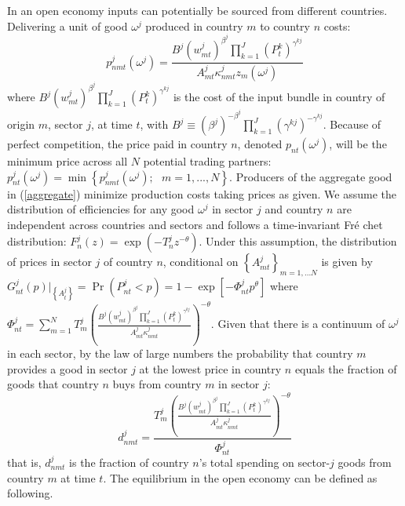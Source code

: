 \documentclass[12pt]{article}
\begin{document}
In an open economy inputs can potentially be sourced from different
countries. Delivering a unit of good $\omega ^{j}$ produced in country $m$
to country $n$ costs: 
\begin{equation*}
p_{nmt}^{j}(\omega ^{j})=\frac{B^{j}\left( w_{mt}^{j}\right) ^{\beta
^{j}}\prod_{k=1}^{J}(P_{t}^{k})^{\gamma ^{kj}}}{A_{mt}^{j}\kappa
_{nmt}^{j}z_{m}(\omega ^{j})}
\end{equation*}%
where $B^{j}\left( w_{mt}^{j}\right) ^{\beta
^{j}}\prod_{k=1}^{J}(P_{t}^{k})^{\gamma ^{kj}}$ is the cost of the input
bundle in country of origin $m$, sector $j$, at time $t$, 
with $B^j \equiv \left( \beta ^{j}\right) ^{-\beta ^{j}} \prod_{k=1}^J (\gamma^{kj})^{-\gamma^{kj}}$. 
Because of perfect
competition, the price paid in country $n$, denoted $p_{nt}(\omega ^{j})$,
will be the minimum price across all $N$ potential trading partners: $%
p_{nt}^{j}(\omega ^{j})=\min \left\{ p_{nmt}^{j}(\omega ^{j});\text{ }%
m=1,...,N\right\} .$ Producers of the aggregate good in (\ref{aggregate})
minimize production costs taking prices as given. We assume the distribution
of efficiencies for any good $\omega ^{j}$ in sector $j$ and country $n$ are
independent across countries and sectors and follows a time-invariant Fr\'{e}%
chet distribution: $F_{n}^{j}(z)=\exp (-T_{n}^{j}z^{-\theta })$. Under this
assumption, the distribution of prices in sector $j$ of country $n$,
conditional on $\left\{ A_{mt}^{j}\right\} _{m=1,...N}$ is given by $%
G_{nt}^{j}(p)|_{\left\{ A_{t}^{j}\right\} }=\Pr (P_{nt}^{j}<p)=1-\exp \left[
-\Phi _{nt}^{j}p^{\theta }\right] $ where $\Phi
_{nt}^{j}=\sum_{m=1}^{N}T_{m}^{j}\left( \frac{B^{j}\left( w_{mt}^{j}\right)
^{\beta ^{j}}\prod_{k=1}^{J}(P_{t}^{k})^{\gamma ^{kj}}}{A_{mt}^{j}\kappa
_{nmt}^{j}}\right) ^{-\theta }$. Given that there is a continuum of $\omega
^{j}$ in each sector, by the law of large numbers the probability that
country $m$ provides a good in sector $j$ at the lowest price in country $n$
equals the fraction of goods that country $n$ buys from country $m$ in
sector $j$: 
\begin{equation}
d_{nmt}^{j}=\frac{T_{m}^{j}\left( \frac{B^{j}\left( w_{mt}^{j}\right)
^{\beta ^{j}}\prod_{k=1}^{J}(P_{t}^{k})^{\gamma ^{kj}}}{A_{mt}^{j}\kappa
_{nmt}^{j}}\right) ^{-\theta }}{\Phi _{nt}^{j}}  \label{shares}
\end{equation}%
that is, $d_{nmt}^{j}$ is the fraction of country $n$'s total spending on
sector-$j$ goods from country $m$ at time $t$. The equilibrium in the open
economy can be defined as following.
\end{document}
